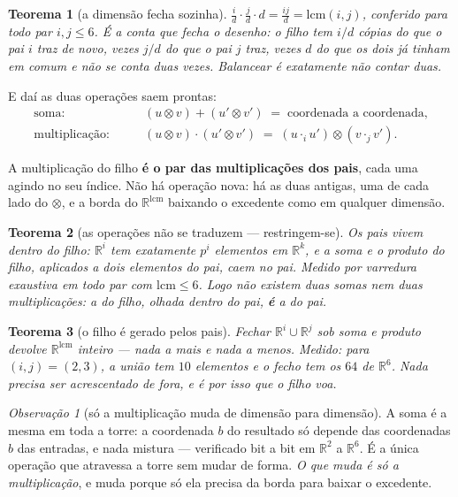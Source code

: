 \documentclass[11pt]{article}
\newcommand{\R}{\mathbb R}
\theoremstyle{plain}
\newtheorem{teorema}{Teorema}
\theoremstyle{remark}
\newtheorem{obs}{Observação}
\begin{document}
\begin{teorema}[a dimensão fecha sozinha]
$\displaystyle \frac{i}{d}\cdot\frac{j}{d}\cdot d=\frac{ij}{d}=\mathrm{lcm}(i,j)$, conferido para
todo par $i,j\le 6$. É a conta que fecha o desenho: o filho tem $i/d$ cópias do que o pai $i$ traz de
novo, vezes $j/d$ do que o pai $j$ traz, vezes $d$ do que os dois \emph{já tinham em comum e não se
conta duas vezes}. Balancear é exatamente não contar duas.
\end{teorema}

\noindent E daí as duas operações saem prontas:
\begin{align}
  \text{soma:}&\qquad (u\otimes v)+(u'\otimes v') \;=\; \text{coordenada a coordenada,}\\[2pt]
  \text{multiplicação:}&\qquad (u\otimes v)\cdot(u'\otimes v') \;=\; (u\cdot_i u')\otimes(v\cdot_j v').
\end{align}

\noindent A multiplicação do filho \textbf{é o par das multiplicações dos pais}, cada uma agindo no
seu índice. Não há operação nova: há as duas antigas, uma de cada lado do $\otimes$, e a borda do
$\R^{\mathrm{lcm}}$ baixando o excedente como em qualquer dimensão.

\begin{teorema}[as operações não se traduzem --- restringem-se]
Os pais vivem \emph{dentro} do filho: $\R^i$ tem exatamente $p^i$ elementos em $\R^k$, e a soma e o
produto do filho, aplicados a dois elementos do pai, caem no pai. Medido por varredura exaustiva em
todo par com $\mathrm{lcm}\le6$. Logo não existem duas somas nem duas multiplicações: a do filho,
olhada dentro do pai, \textbf{é} a do pai.
\end{teorema}

\begin{teorema}[o filho é gerado pelos pais]
Fechar $\R^i\cup\R^j$ sob soma e produto devolve $\R^{\mathrm{lcm}}$ \emph{inteiro} --- nada a mais e
nada a menos. Medido: para $(i,j)=(2,3)$, a união tem $10$ elementos e o fecho tem os $64$ de $\R^6$.
Nada precisa ser acrescentado de fora, e é por isso que o filho voa.
\end{teorema}

\begin{obs}[só a multiplicação muda de dimensão para dimensão]
A soma é a mesma em toda a torre: a coordenada $b$ do resultado só depende das coordenadas $b$ das
entradas, e nada mistura --- verificado bit a bit em $\R^2$ a $\R^6$. É a única operação que atravessa
a torre sem mudar de forma. \emph{O que muda é só a multiplicação}, e muda porque só ela precisa da
borda para baixar o excedente.
\end{obs}
\end{document}
